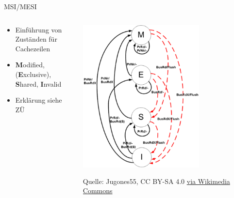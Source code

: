 \documentclass[
  german,            %
  aspectratio=169,    %
]{tumbeamer}
\begin{document}
\begin{frame}[fragile, c]{MSI/MESI}{}
  \begin{columns}[c]
    \begin{column}{0.5\textwidth}
      \begin{itemize}
        \item Einführung von Zuständen für Cachezeilen
        \item \textbf{M}odified, (\textbf{E}xclusive), \textbf{S}hared, \textbf{I}nvalid
        \item Erklärung siehe ZÜ
      \end{itemize}
    \end{column}
    \begin{column}{0.5\textwidth}
      \begin{center}
        \includegraphics[width=0.7\textwidth]{w13_mesi.png}
      \end{center}
      \centering
      \tiny{Quelle: Jugones55, CC BY-SA 4.0 \href{https://creativecommons.org/licenses/by-sa/4.0}{via Wikimedia Commons}}
    \end{column}
  \end{columns}
\end{frame}
\end{document}
